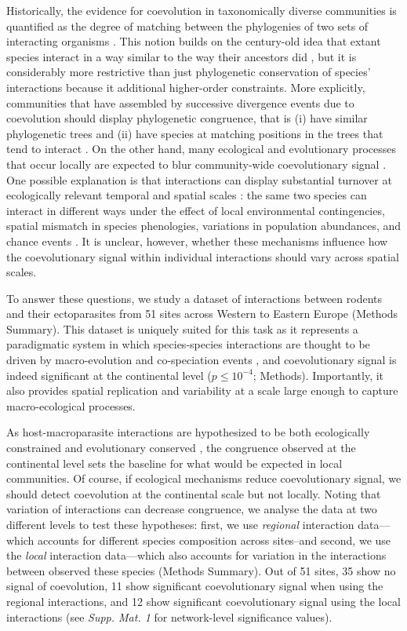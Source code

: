 Historically, the evidence for coevolution in taxonomically diverse
communities is quantified as the degree of matching between the
phylogenies of two sets of interacting organisms \citep{lege02}. This
notion builds on the century-old idea that extant species interact in a
way similar to the way their ancestors did \citep{fahr13}, but it is
considerably more restrictive than just phylogenetic conservation of
species' interactions \citep{reze07, eklo11} because it additional
higher-order constraints. More explicitly, communities that have
assembled by successive divergence events due to coevolution should
display phylogenetic congruence, that is (i) have similar phylogenetic
trees and (ii) have species at matching positions in the trees that tend
to interact \citep{page03}. On the other hand, many ecological and
evolutionary processes that occur locally are expected to blur
community-wide coevolutionary signal \citep{pois15}. One possible
explanation is that interactions can display substantial turnover at
ecologically relevant temporal and spatial scales \citep{pois12c}: the
same two species can interact in different ways under the effect of
local environmental contingencies, spatial mismatch in species
phenologies, variations in population abundances, and chance events
\citep{pois14}. It is unclear, however, whether these mechanisms
influence how the coevolutionary signal within individual interactions
should vary across spatial scales.

To answer these questions, we study a dataset of interactions between
rodents and their ectoparasites from 51 sites across Western to Eastern
Europe \citep{kras12b} (Methods Summary). This dataset is uniquely
suited for this task as it represents a paradigmatic system in which
species-species interactions are thought to be driven by macro-evolution
and co-speciation events \citep{vern09}, and coevolutionary signal is
indeed significant at the continental level \citep{kras12a}
(\(p \leq 10^{-4}\); Methods). Importantly, it also provides spatial
replication and variability at a scale large enough to capture
macro-ecological processes.

As host-macroparasite interactions are hypothesized to be both
ecologically constrained and evolutionary conserved \citep{comb01}, the
congruence observed at the continental level sets the baseline for what
would be expected in local communities. Of course, if ecological
mechanisms reduce coevolutionary signal, we should detect coevolution at
the continental scale but not locally. Noting that variation of
interactions can decrease congruence, we analyse the data at two
different levels to test these hypotheses: first, we use \emph{regional}
interaction data---which accounts for different species composition
across sites--and second, we use the \emph{local} interaction
data---which also accounts for variation in the interactions between
observed these species (Methods Summary). Out of 51 sites, 35 show no
signal of coevolution, 11 show significant coevolutionary signal when
using the regional interactions, and 12 show significant coevolutionary
signal using the local interactions (see \emph{Supp. Mat. 1} for
network-level significance values).

